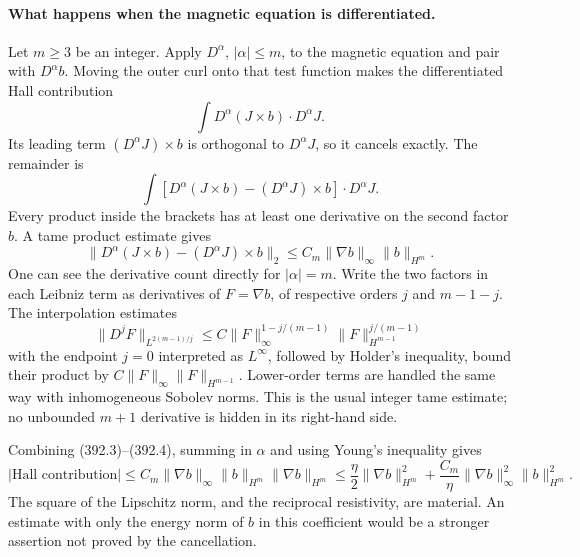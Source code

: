\documentclass[11pt]{article}
\begin{document}
\paragraph{What happens when the magnetic equation is differentiated.}
Let $m\geq3$ be an integer. Apply $D^\alpha$, $|\alpha|\leq m$,
to the magnetic equation and pair with $D^\alpha b$. Moving the
outer curl onto that test function makes the differentiated Hall
contribution
\[
 \int D^\alpha(J\times b)\cdot D^\alpha J.
\]
Its leading term $(D^\alpha J)\times b$ is orthogonal to
$D^\alpha J$, so it cancels exactly. The remainder is
\[
 \int\left[D^\alpha(J\times b)-(D^\alpha J)\times b\right]
                            \cdot D^\alpha J.
 \tag{392.3}
\]
Every product inside the brackets has at least one derivative on
the second factor $b$. A tame product estimate gives
\[
 \|D^\alpha(J\times b)-(D^\alpha J)\times b\|_2
       \leq C_m\|\nabla b\|_\infty\|b\|_{H^m}.
 \tag{392.4}
\]
One can see the derivative count directly for $|\alpha|=m$.
Write the two factors in each Leibniz term as derivatives of
$F=\nabla b$, of respective orders $j$ and $m-1-j$.
The interpolation estimates
\[
 \|D^jF\|_{L^{2(m-1)/j}}
 \leq C\|F\|_\infty^{1-j/(m-1)}
                   \|F\|_{H^{m-1}}^{j/(m-1)}
\]
with the endpoint $j=0$ interpreted as $L^\infty$, followed by
Holder's inequality, bound their product by
$C\|F\|_\infty\|F\|_{H^{m-1}}$. Lower-order terms are handled
the same way with inhomogeneous Sobolev norms. This is the usual
integer tame estimate; no unbounded $m+1$ derivative is hidden
in its right-hand side.

Combining (392.3)--(392.4), summing in $\alpha$ and using Young's
inequality gives
\[
 |\text{Hall contribution}|
 \leq C_m\|\nabla b\|_\infty\|b\|_{H^m}\|\nabla b\|_{H^m}
 \leq\frac\eta2\|\nabla b\|_{H^m}^2
    +\frac{C_m}{\eta}\|\nabla b\|_\infty^2\|b\|_{H^m}^2.
 \tag{392.5}
\]
The square of the Lipschitz norm, and the reciprocal resistivity,
are material. An estimate with only the energy norm of $b$ in this
coefficient would be a stronger assertion not proved by the cancellation.
\end{document}
